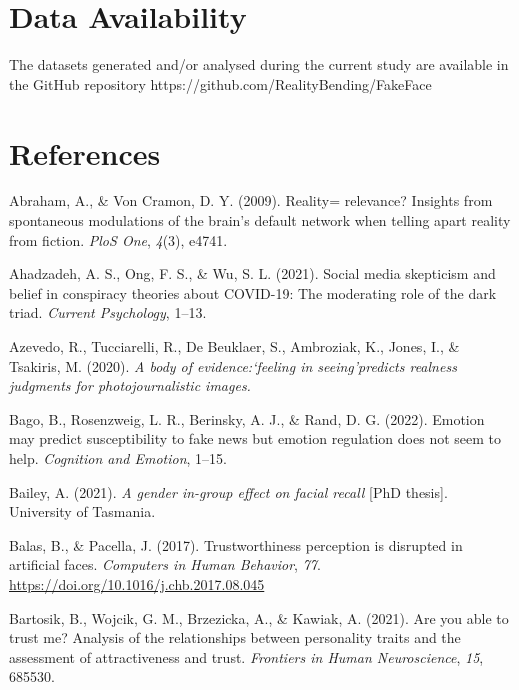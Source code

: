 \documentclass[
  man,
  floatsintext,
  longtable,
  nolmodern,
  notxfonts,
  notimes,
  colorlinks=true,linkcolor=blue,citecolor=blue,urlcolor=blue]{apa7}
\newlength{\cslhangindent}
\newenvironment{CSLReferences}[2] %
 {\begin{list}{}{%
  \setlength{\itemindent}{0pt}
  \setlength{\leftmargin}{0pt}
  \setlength{\parsep}{0pt}
  \ifodd #1
   \setlength{\leftmargin}{\cslhangindent}
   \setlength{\itemindent}{-1\cslhangindent}
  \fi
  \setlength{\itemsep}{#2\baselineskip}}}
 {\end{list}}
\begin{document}
\section{Data Availability}\label{data-availability}

The datasets generated and/or analysed during the current study are
available in the GitHub repository
https://github.com/RealityBending/FakeFace

\pagebreak

\section{References}\label{references}

\label{refs}
\begin{CSLReferences}{1}{0}
Abraham, A., \& Von Cramon, D. Y. (2009). Reality= relevance? Insights
from spontaneous modulations of the brain's default network when telling
apart reality from fiction. \emph{PloS One}, \emph{4}(3), e4741.

Ahadzadeh, A. S., Ong, F. S., \& Wu, S. L. (2021). Social media
skepticism and belief in conspiracy theories about COVID-19: The
moderating role of the dark triad. \emph{Current Psychology}, 1--13.

Azevedo, R., Tucciarelli, R., De Beuklaer, S., Ambroziak, K., Jones, I.,
\& Tsakiris, M. (2020). \emph{A body of evidence:`feeling in
seeing'predicts realness judgments for photojournalistic images.}

Bago, B., Rosenzweig, L. R., Berinsky, A. J., \& Rand, D. G. (2022).
Emotion may predict susceptibility to fake news but emotion regulation
does not seem to help. \emph{Cognition and Emotion}, 1--15.

Bailey, A. (2021). \emph{A gender in-group effect on facial recall}
{[}PhD thesis{]}. University of Tasmania.

Balas, B., \& Pacella, J. (2017). Trustworthiness perception is
disrupted in artificial faces. \emph{Computers in Human Behavior},
\emph{77}. \url{https://doi.org/10.1016/j.chb.2017.08.045}

Bartosik, B., Wojcik, G. M., Brzezicka, A., \& Kawiak, A. (2021). Are
you able to trust me? Analysis of the relationships between personality
traits and the assessment of attractiveness and trust. \emph{Frontiers
in Human Neuroscience}, \emph{15}, 685530.


\end{CSLReferences}
\end{document}
